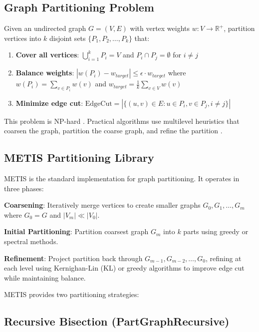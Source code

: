 \subsection{Graph Partitioning Problem}

Given an undirected graph $G = (V, E)$ with vertex weights $w: V \to \mathbb{R}^+$, partition vertices into $k$ disjoint sets $\{P_1, P_2, \ldots, P_k\}$ that:

\begin{enumerate}
\item \textbf{Cover all vertices}: $\bigcup_{i=1}^k P_i = V$ and $P_i \cap P_j = \emptyset$ for $i \neq j$
\item \textbf{Balance weights}: $|w(P_i) - w_{target}| \leq \epsilon \cdot w_{target}$ where $w(P_i) = \sum_{v \in P_i} w(v)$ and $w_{target} = \frac{1}{k}\sum_{v \in V} w(v)$
\item \textbf{Minimize edge cut}: $\text{EdgeCut} = |\{(u,v) \in E : u \in P_i, v \in P_j, i \neq j\}|$
\end{enumerate}

This problem is NP-hard \citep{garey1979}. Practical algorithms use multilevel heuristics that coarsen the graph, partition the coarse graph, and refine the partition \citep{karypis1998}.

\subsection{METIS Partitioning Library}

METIS \citep{karypis1998metis} is the standard implementation for graph partitioning. It operates in three phases:

\textbf{Coarsening}: Iteratively merge vertices to create smaller graphs $G_0, G_1, \ldots, G_m$ where $G_0 = G$ and $|V_m| \ll |V_0|$.

\textbf{Initial Partitioning}: Partition coarsest graph $G_m$ into $k$ parts using greedy or spectral methods.

\textbf{Refinement}: Project partition back through $G_{m-1}, G_{m-2}, \ldots, G_0$, refining at each level using Kernighan-Lin (KL) or greedy algorithms to improve edge cut while maintaining balance.

METIS provides two partitioning strategies:

\subsection{Recursive Bisection (PartGraphRecursive)}

